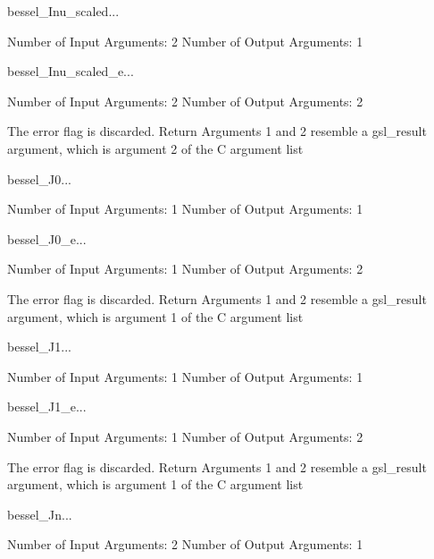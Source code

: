 \begin{funcdesc}{bessel_Inu_scaled}{...}

    Number of Input  Arguments:  2
    Number of Output Arguments:  1
\end{funcdesc}

\begin{funcdesc}{bessel_Inu_scaled_e}{...}

    Number of Input  Arguments:  2
    Number of Output Arguments:  2

The error flag is discarded.
Return Arguments 1 and 2 resemble a gsl_result argument,
	which is  argument 2 of the C argument list

\end{funcdesc}

\begin{funcdesc}{bessel_J0}{...}

    Number of Input  Arguments:  1
    Number of Output Arguments:  1
\end{funcdesc}

\begin{funcdesc}{bessel_J0_e}{...}

    Number of Input  Arguments:  1
    Number of Output Arguments:  2

The error flag is discarded.
Return Arguments 1 and 2 resemble a gsl_result argument,
	which is  argument 1 of the C argument list

\end{funcdesc}

\begin{funcdesc}{bessel_J1}{...}

    Number of Input  Arguments:  1
    Number of Output Arguments:  1
\end{funcdesc}

\begin{funcdesc}{bessel_J1_e}{...}

    Number of Input  Arguments:  1
    Number of Output Arguments:  2

The error flag is discarded.
Return Arguments 1 and 2 resemble a gsl_result argument,
	which is  argument 1 of the C argument list

\end{funcdesc}

\begin{funcdesc}{bessel_Jn}{...}

    Number of Input  Arguments:  2
    Number of Output Arguments:  1
\end{funcdesc}

